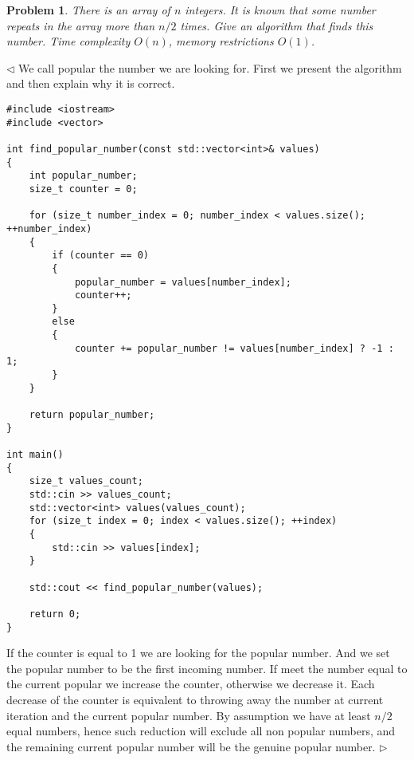 \documentclass[12pt]{article}
\newtheorem{problem}{Problem}[subsection]
\newenvironment{solution}{\par $\triangleleft$}{$\triangleright$}
\begin{document}
\begin{problem} There is an array of $n$ integers. It is known that some number
repeats in the array more than $n/2$ times. Give an algorithm that finds this
number. Time complexity $O(n)$, memory restrictions $O(1)$.
\end{problem}
\begin{solution}
    We call popular the number we are looking for. First we present the
    algorithm and then explain why it is correct.
    \begin{verbatim}
#include <iostream>
#include <vector>

int find_popular_number(const std::vector<int>& values)
{
    int popular_number;
    size_t counter = 0;

    for (size_t number_index = 0; number_index < values.size(); ++number_index)
    {
        if (counter == 0)
        {
            popular_number = values[number_index];
            counter++;
        }
        else
        {
            counter += popular_number != values[number_index] ? -1 : 1;
        }
    }

    return popular_number;
}

int main()
{
    size_t values_count;
    std::cin >> values_count;
    std::vector<int> values(values_count);
    for (size_t index = 0; index < values.size(); ++index)
    {
        std::cin >> values[index];
    }

    std::cout << find_popular_number(values);

    return 0;
}
    \end{verbatim}

    If the counter is equal to 1 we are looking for the popular number. And we
    set the popular number to be the first incoming number. If meet the number
    equal to the current popular we increase the counter, otherwise we decrease
    it. Each decrease of the counter is equivalent to throwing away the number
    at current iteration and the current popular number. By assumption we have
    at least $n/2$ equal numbers, hence such reduction will exclude all non
    popular numbers, and the remaining current popular number will be the
    genuine popular number.
\end{solution}
\end{document}
